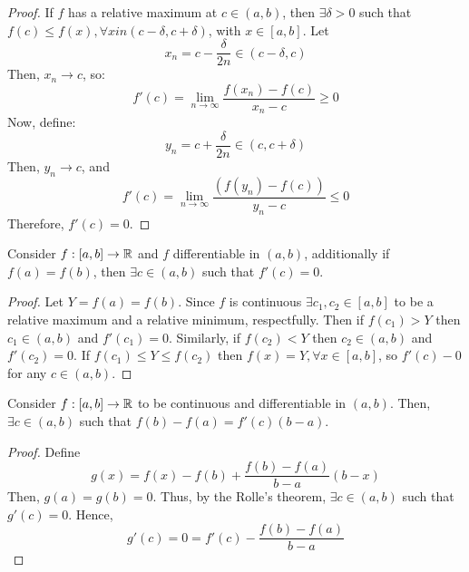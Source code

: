 \begin{proof}
    If $f$ has a relative maximum at $c \in (a,b)$, then $\exists \delta > 0$ such that $f(c) \leq f(x), \forall x in (c- \delta, c + \delta)$, with $x \in [a,b]$. Let 
    \begin{equation*}
        x_n = c - \frac{\delta}{2n} \in (c- \delta, c)
    \end{equation*}
    Then, $x_n \to c$, so:
    \begin{equation*}
        f'(c) = \lim \limits_{n \to \infty} \frac{f(x_n) - f(c)}{x_n - c} \geq 0
    \end{equation*}
    Now, define:
    \begin{equation*}
        y_n = c + \frac{\delta}{2n} \in (c, c+\delta)
    \end{equation*}
    Then, $y_n \to c$, and
    \begin{equation*}
        f'(c) = \lim \limits_{n \to \infty}\frac{(f(y_n) - f(c))}{y_n - c} \leq 0
    \end{equation*}
    Therefore, $f'(c) = 0$.
\end{proof}

\begin{theorem}
    Consider $f: [a,b] \to \mathbb{R}$ and $f$ differentiable in $(a,b)$, additionally if $f(a) = f(b)$, then $\exists c \in (a,b)$ such that $f'(c) = 0$.
\end{theorem}

\begin{proof}
    Let $Y = f(a) = f(b)$. Since $f$ is continuous $\exists c_1, c_2 \in [a,b]$ to be a relative maximum and a relative minimum, respectfully. Then if $f(c_1) > Y$ then $ c_1 \in (a,b)$ and $f'(c_1) = 0$. Similarly, if $f(c_2) < Y$ then $c_2 \in (a,b)$ and $f'(c_2) = 0$. If $f(c_1) \leq Y \leq f(c_2)$ then $f(x) = Y, \forall x \in [a,b]$, so $f'(c) - 0$ for any $c \in (a,b)$.
\end{proof}

\begin{theorem}
    Consider $f: [a,b] \to \mathbb{R}$ to be continuous and differentiable in $(a,b)$. Then, $\exists c \in (a,b)$ such that $f(b) - f(a) = f'(c)(b - a)$.
\end{theorem}

\begin{proof}
    Define
    \begin{equation*}
        g(x) = f(x) - f(b) + \frac{f(b) - f(a)}{b - a}(b - x)
    \end{equation*}
    Then, $g(a) = g(b) = 0$. Thus, by the Rolle's theorem, $\exists c \in (a,b)$ such that $g'(c) = 0$. Hence,
    \begin{equation*}
        g'(c) = 0 = f'(c) - \frac{f(b) - f(a)}{b-a}
    \end{equation*}
\end{proof}

